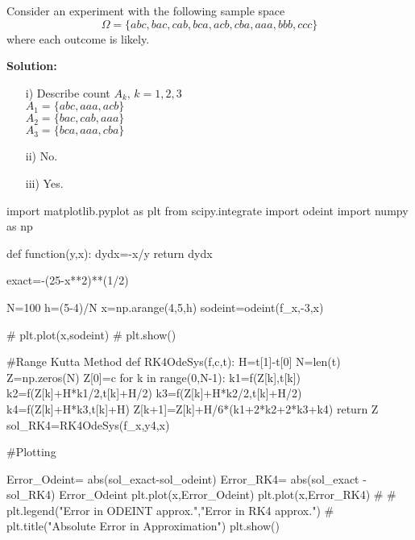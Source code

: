 \documentclass[12pt,a4paper]{article}
\begin{document}
\begin{quest}

Consider an experiment with the following sample space  $$\Omega = \lbrace abc, bac, cab, bca, acb, cba, aaa, bbb, ccc\rbrace$$
where each outcome is likely.

\end{quest}

\textbf{Solution:}\\
\begin{itemize}
	\item[i)] Describe count $A_k,\, k=1,2,3$\\
	
	$A_1=\lbrace abc,aaa,acb\rbrace$\\
	$A_2=\lbrace bac,cab,aaa\rbrace$\\
	$A_3=\lbrace bca,aaa,cba\rbrace$
	\item[ii)] No.\\
	 \item[iii)] Yes.
 \end{itemize}
 
 \begin{verbatim*}

import matplotlib.pyplot as plt
from scipy.integrate import odeint
import numpy as np

def function(y,x):
	dydx=-x/y
	return dydx

exact=-(25-x**2)**(1/2)

N=100
h=(5-4)/N
x=np.arange(4,5,h)
sodeint=odeint(f_x,-3,x)


# plt.plot(x,sodeint)
# plt.show()

#Range Kutta Method
def RK4OdeSys(f,c,t):
H=t[1]-t[0]
N=len(t)
Z=np.zeros(N)
Z[0]=c
for k in range(0,N-1):
k1=f(Z[k],t[k])
k2=f(Z[k]+H*k1/2,t[k]+H/2)
k3=f(Z[k]+H*k2/2,t[k]+H/2)
k4=f(Z[k]+H*k3,t[k]+H)
Z[k+1]=Z[k]+H/6*(k1+2*k2+2*k3+k4)
return Z
sol_RK4=RK4OdeSys(f_x,y4,x)

#Plotting

Error_Odeint= abs(sol_exact-sol_odeint)
Error_RK4= abs(sol_exact - sol_RK4)
Error_Odeint
plt.plot(x,Error_Odeint)
plt.plot(x,Error_RK4)
# # plt.legend("Error in ODEINT approx.","Error in RK4 approx.")
# plt.title("Absolute Error in Approximation")
plt.show()
\end{verbatim*}
 
 
\end{document}
